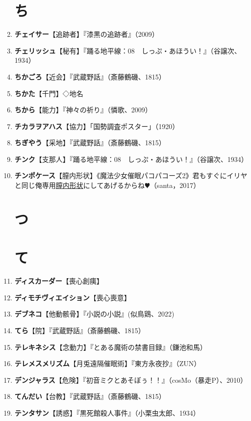 \documentclass[twocolumn]{jsbook}
\newcommand{\ccite}[1]{《#1》}
\begin{document}
\begin{enumerate}
\section*{ち}
    \item \textbf{チェイサー}【追跡者】『漆黒の追跡者』（2009）
    \item \textbf{チェリッシュ}【秘有】『踊る地平線：08　しっぷ・あほうい！』（谷譲次、1934）
    \item \textbf{ちかごろ}【近会】『武蔵野話』（斎藤鶴磯、1815）
    \item \textbf{ちかた}【千門】◇地名
    \item \textbf{ちから}【能力】『神々の祈り』（憐歌、2009）
    \item \textbf{チカラヲアハス}【協力】「国勢調査ポスター」（1920）
    \item \textbf{ちぎやう}【采地】『武蔵野話』（斎藤鶴磯、1815）
    \item \textbf{チンク}【支那人】『踊る地平線：08　しっぷ・あほうい！』（谷譲次、1934）
    \item \textbf{チンポケース}【膣内形状】\ccite{魔法少女催眠パコパコーズ2}{君もすぐにイリヤと同じ俺専用\uline{膣内形状}にしてあげるからね$\varheartsuit$}（santa，2017）
\section*{つ}
\section*{て}
    \item \textbf{ディスカーダー}【喪心創痍】
    \item \textbf{ディモチヴィエイション}【喪心喪意】
    \item \textbf{デブネコ}【他動骸骨】『小説の小説』(似鳥鶏、2022)
    \item \textbf{てら}【院】『武蔵野話』（斎藤鶴磯、1815）
    \item \textbf{テレキネシス}【念動力】『とある魔術の禁書目録』（鎌池和馬）
    \item \textbf{テレメスメリズム}【月兎遠隔催眠術】『東方永夜抄』（ZUN）
    \item \textbf{デンジャラス}【危険】『初音ミクとあそぼぅ！！』（cosMo（暴走P）、2010）
    \item \textbf{てんだい}【台教】『武蔵野話』（斎藤鶴磯、1815）
    \item \textbf{テンタサン}【誘惑】『黒死館殺人事件』（小栗虫太郎、1934）

\end{enumerate}
\end{document}
